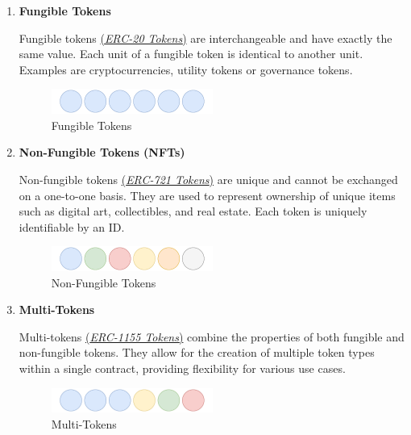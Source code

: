 \documentclass[12pt]{article}
\begin{document}
\begin{enumerate}
  \item \textbf{Fungible Tokens}

  Fungible tokens \href{https://eips.ethereum.org/EIPS/eip-20}{(\textit{ERC-20 Tokens})} are interchangeable and have exactly the same value. Each unit of a fungible token is identical to another unit. Examples are cryptocurrencies, utility tokens or governance tokens.

    \begin{figure}[h!]
      \centering
      \includegraphics[width=0.5\textwidth]{fungible-tokens.pdf}
      \caption{Fungible Tokens}
      \label{fig:fungible-tokens}
    \end{figure}

    \item \textbf{Non-Fungible Tokens (NFTs)}

    Non-fungible tokens \href{https://eips.ethereum.org/EIPS/eip-721}{(\textit{ERC-721 Tokens})} are unique and cannot be exchanged on a one-to-one basis. They are used to represent ownership of unique items such as digital art, collectibles, and real estate. Each token is uniquely identifiable by an ID.

    \begin{figure}[h!]
      \centering
      \includegraphics[width=0.5\textwidth]{non-fungible-tokens.pdf}
      \caption{Non-Fungible Tokens}
      \label{fig:non-fungible-tokens}
    \end{figure}

    \item \textbf{Multi-Tokens}

    Multi-tokens \href{https://eips.ethereum.org/EIPS/eip-1155}{(\textit{ERC-1155 Tokens})} combine the properties of both fungible and non-fungible tokens. They allow for the creation of multiple token types within a single contract, providing flexibility for various use cases.

    \begin{figure}[h!]
      \centering
      \includegraphics[width=0.5\textwidth]{multi-token.pdf}
      \caption{Multi-Tokens}
      \label{fig:multi-token}
    \end{figure}
  \end{enumerate}
\end{document}
